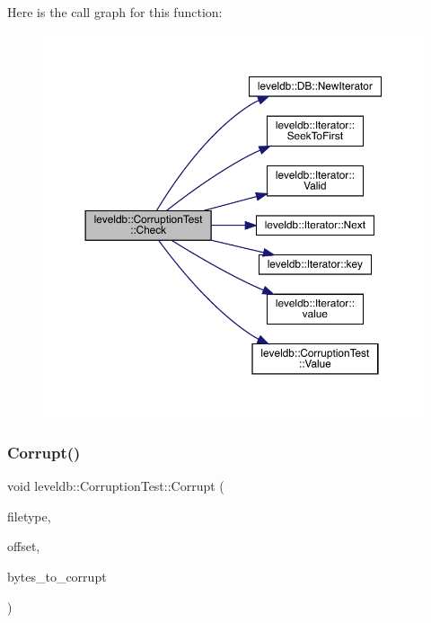 Here is the call graph for this function\+:
\nopagebreak
\begin{figure}[H]
\begin{center}
\leavevmode
\includegraphics[width=350pt]{classleveldb_1_1_corruption_test_aa03dcde1d0771ebbcf7d6ac8bda9c725_cgraph}
\end{center}
\end{figure}
\mbox{\label{classleveldb_1_1_corruption_test_a22060ac0a3697640cdcf36973339b646}} 
\subsubsection{\texorpdfstring{Corrupt()}{Corrupt()}}
{\footnotesize\ttfamily void leveldb\+::\+Corruption\+Test\+::\+Corrupt (\begin{DoxyParamCaption}\item[{\mbox{\hyperlink{namespaceleveldb_ab8e559ac5cadcb2b5dd531c60df944f1}{File\+Type}}}]{filetype,  }\item[{int}]{offset,  }\item[{int}]{bytes\+\_\+to\+\_\+corrupt }\end{DoxyParamCaption})\hspace{0.3cm}{\ttfamily [inline]}}

